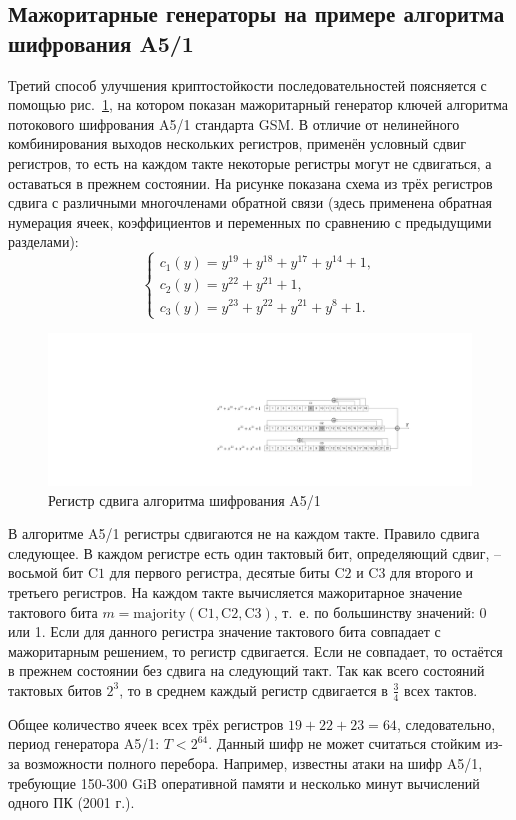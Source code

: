 \subsection[Мажоритарные генераторы, шифр A5/1]{Мажоритарные генераторы на примере алгоритма шифрования A5/1}\label{section:majority_generators}

Третий способ улучшения криптостойкости последовательностей поясняется с помощью рис.~\ref{fig:gsm-a51-cipher}, на котором показан мажоритарный генератор ключей алгоритма потокового шифрования A5/1 стандарта GSM. В отличие от нелинейного комбинирования выходов нескольких регистров, применён условный сдвиг регистров, то есть на каждом такте некоторые регистры могут не сдвигаться, а оставаться в прежнем состоянии. На рисунке показана схема из трёх регистров сдвига с различными многочленами обратной связи (здесь применена обратная нумерация ячеек, коэффициентов и переменных по сравнению с предыдущими разделами):
\[ \left\{ \begin{array}{l}
    c_1(y) = y^{19} + y^{18} + y^{17} + y^{14} + 1, \\
    c_2(y) = y^{22} + y^{21} + 1, \\
    c_3(y) = y^{23} + y^{22} + y^{21} + y^8 + 1.
\end{array} \right. \]

\begin{figure}[!ht]
    \centering
	\includegraphics[width=\textwidth]{pic/gsm-a51-cipher}
    \caption{Регистр сдвига алгоритма шифрования A5/1\label{fig:gsm-a51-cipher}}
\end{figure}

В алгоритме A5/1 регистры сдвигаются не на каждом такте. Правило сдвига следующее. В каждом регистре есть один тактовый бит, определяющий сдвиг, -- восьмой бит $\textrm{C1}$ для первого регистра, десятые биты $\textrm{C2}$ и $\textrm{C3}$ для второго и третьего регистров. На каждом такте вычисляется мажоритарное значение тактового бита $m = \textrm{majority}(\textrm{C1}, \textrm{C2}, \textrm{C3})$, т.~е. по большинству значений: 0 или 1. Если для данного регистра значение тактового бита совпадает с мажоритарным решением, то регистр сдвигается. Если не совпадает, то остаётся в прежнем состоянии без сдвига на следующий такт. Так как всего состояний тактовых битов $2^3$, то в среднем каждый регистр сдвигается в $\frac{3}{4}$ всех тактов.

Общее количество ячеек всех трёх регистров $19+22+23=64$, следовательно, период генератора A5/1: $T < 2^{64}$. Данный шифр не может считаться стойким из-за возможности полного перебора. Например, известны атаки на шифр A5/1, требующие 150-300 GiB оперативной памяти и несколько минут вычислений одного ПК (2001 г.).
